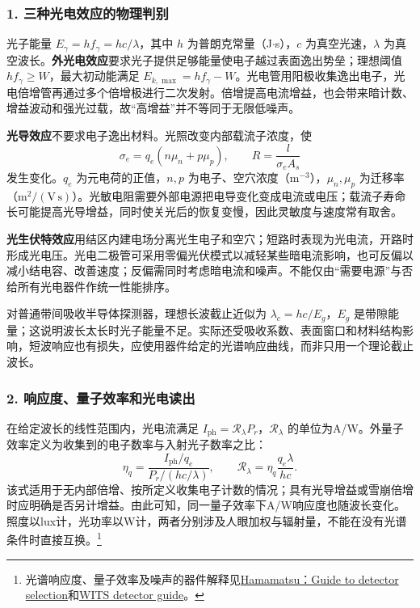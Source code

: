 \subsubsection*{1. 三种光电效应的物理判别}
光子能量 $E_\gamma=h f_\gamma=hc/\lambda$，其中 $h$ 为普朗克常量（J$\cdot$s），$c$ 为真空光速，$\lambda$ 为真空波长。\textbf{外光电效应}要求光子提供足够能量使电子越过表面逸出势垒；理想阈值 $hf_\gamma\ge W$，最大初动能满足 $E_{k,\max}=hf_\gamma-W$。光电管用阳极收集逸出电子，光电倍增管再通过多个倍增极进行二次发射。倍增提高电流增益，也会带来暗计数、增益波动和强光过载，故“高增益”并不等同于无限低噪声。

\textbf{光导效应}不要求电子逸出材料。光照改变内部载流子浓度，使
\[
\sigma_e=q_e(n\mu_n+p\mu_p),\qquad
R=\frac{l}{\sigma_e A_s}
\]
发生变化。$q_e$ 为元电荷的正值，$n,p$ 为电子、空穴浓度（$\mathrm m^{-3}$），$\mu_n,\mu_p$ 为迁移率（$\mathrm m^2/(\mathrm{V\,s})$）。光敏电阻需要外部电源把电导变化变成电流或电压；载流子寿命长可能提高光导增益，同时使关光后的恢复变慢，因此灵敏度与速度常有取舍。

\textbf{光生伏特效应}用结区内建电场分离光生电子和空穴；短路时表现为光电流，开路时形成光电压。光电二极管可采用零偏光伏模式以减轻某些暗电流影响，也可反偏以减小结电容、改善速度；反偏需同时考虑暗电流和噪声。不能仅由“需要电源”与否给所有光电器件作统一性能排序。

对普通带间吸收半导体探测器，理想长波截止近似为 $\lambda_c=hc/E_g$，$E_g$ 是带隙能量；这说明波长太长时光子能量不足。实际还受吸收系数、表面窗口和材料结构影响，短波响应也有损失，应使用器件给定的光谱响应曲线，而非只用一个理论截止波长。

\subsubsection*{2. 响应度、量子效率和光电读出}
在给定波长的线性范围内，光电流满足 $I_{\mathrm{ph}}=\mathcal R_\lambda P_r$，$\mathcal R_\lambda$ 的单位为A/W。外量子效率定义为收集到的电子数率与入射光子数率之比：
\[
\eta_q=\frac{I_{\mathrm{ph}}/q_e}{P_r/(hc/\lambda)},\qquad
\boxed{\mathcal R_\lambda=\eta_q\frac{q_e\lambda}{hc}}.
\]
该式适用于无内部倍增、按所定义收集电子计数的情况；具有光导增益或雪崩倍增时应明确是否另计增益。由此可知，同一量子效率下A/W响应度也随波长变化。照度以lux计，光功率以W计，两者分别涉及人眼加权与辐射量，不能在没有光谱条件时直接互换。\footnote{光谱响应度、量子效率及噪声的器件解释见\href{https://hub.hamamatsu.com/us/en/technical-notes/detector-selection/guide-to-detector-selection.html}{Hamamatsu：Guide to detector selection}和\href{https://hub.hamamatsu.com/us/en/technical-notes/detector-selection/the-wits-guide-to-selecting-a-photodetector.html}{WITS detector guide}。}

